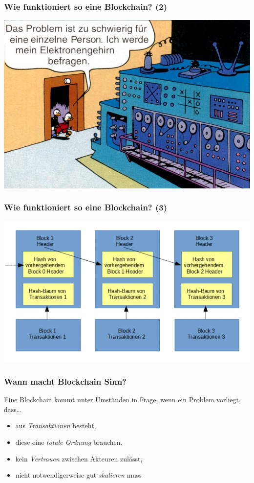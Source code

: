 \documentclass[aspectratio=169,x11names]{beamer}
\begin{document}
\begin{frame}
\frametitle{Wie funktioniert so eine \glqq Blockchain\grqq ? (2)}
\begin{center}
\includegraphics[scale=0.3]{images/elektronengehirn.jpg} 
\end{center}
\end{frame}

\begin{frame}
\frametitle{Wie funktioniert so eine \glqq Blockchain\grqq ? (3)}
\begin{center}
\includegraphics[scale=2]{images/BlockChain_D.png} 
\end{center}
\end{frame}


\begin{frame}
\frametitle{Wann macht Blockchain Sinn?}

Eine Blockchain kommt unter Umständen in Frage, wenn ein Problem vorliegt, dass\dots
\bigskip

\begin{itemize}
\pause\item aus \emph{Transaktionen} besteht,
\pause\item diese eine \emph{totale Ordnung} brauchen,
\pause\item kein \emph{Vertrauen} zwischen Akteuren zulässt,
\pause\item nicht notwendigerweise gut \emph{skalieren} muss 
\end{itemize}
\end{frame}
\end{document}
